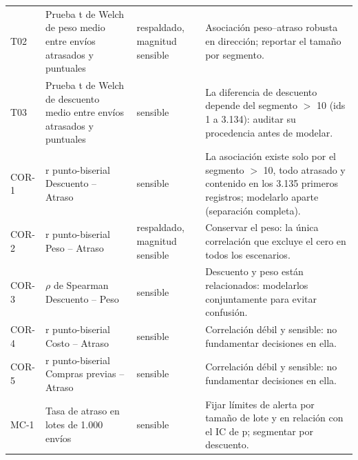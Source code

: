 {\begin{longtable}{@{}l >{\raggedright\arraybackslash}p{4.2cm} >{\raggedright\arraybackslash}p{2.3cm} >{\raggedright\arraybackslash}p{6.4cm}@{}}
T02 & Prueba t de Welch de peso medio entre envíos atrasados y puntuales & respaldado, magnitud sensible & Asociación peso--atraso robusta en dirección; reportar el tamaño por segmento.\\
T03 & Prueba t de Welch de descuento medio entre envíos atrasados y puntuales & sensible & La diferencia de descuento depende del segmento $>$ 10 (ids 1 a 3.134): auditar su procedencia antes de modelar.\\
COR-1 & r punto-biserial Descuento -- Atraso & sensible & La asociación existe solo por el segmento $>$ 10, todo atrasado y contenido en los 3.135 primeros registros; modelarlo aparte (separación completa).\\
COR-2 & r punto-biserial Peso -- Atraso & respaldado, magnitud sensible & Conservar el peso: la única correlación que excluye el cero en todos los escenarios.\\
COR-3 & $\rho$ de Spearman Descuento -- Peso & sensible & Descuento y peso están relacionados: modelarlos conjuntamente para evitar confusión.\\
COR-4 & r punto-biserial Costo -- Atraso & sensible & Correlación débil y sensible: no fundamentar decisiones en ella.\\
COR-5 & r punto-biserial Compras previas -- Atraso & sensible & Correlación débil y sensible: no fundamentar decisiones en ella.\\
MC-1 & Tasa de atraso en lotes de 1.000 envíos & sensible & Fijar límites de alerta por tamaño de lote y en relación con el IC de p; segmentar por descuento.\\
\end{longtable}}

